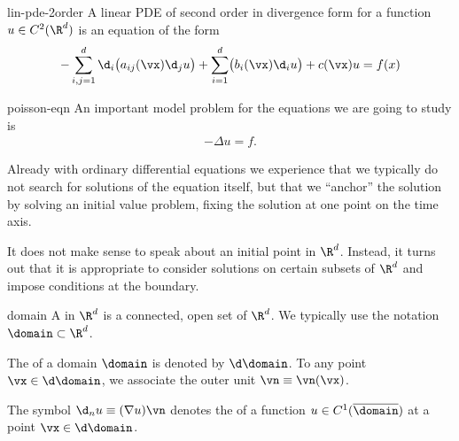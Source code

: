 \begin{Definition}{lin-pde-2order}
  A linear PDE of second order in divergence form for a function
  $u\in C^2(\R^d)$ is an equation of the form
  \begin{gather}
    -\sum_{i,j=1}^d \d_i \bigl(a_{ij}(\vx) \d_j u\bigr)
    + \sum_{i=1}^d \bigl(b_i(\vx) \d_i u\bigr) + c(\vx) u = f(x)
  \end{gather}
\end{Definition}

\begin{Definition}{poisson-eqn}
  An important model problem for the equations we are going to study
  is 
  \begin{gather}
    \label{eq:Poisson}
    -\Delta u = f.
  \end{gather}
\end{Definition}

\begin{intro}
  Already with ordinary differential equations we experience that we
  typically do not search for solutions of the equation itself, but
  that we ``anchor'' the solution by solving an initial value problem,
  fixing the solution at one point on the time axis.

  It does not make sense to speak about an initial point in
  $\R^d$. Instead, it turns out that it is appropriate to consider
  solutions on certain subsets of $\R^d$ and impose conditions at the
  boundary.
\end{intro}

\begin{Definition}{domain}
  A  in $\R^d$ is a connected, open set of $\R^d$. We
  typically use the notation $\domain\subset\R^d$.

  The  of a domain $\domain$ is denoted by
  $\d\domain$. To any point $\vx\in\d\domain$, we associate the outer
  unit  $\vn \equiv \vn(\vx)$.

  The symbol $\d_n u \equiv (\nabla u) \vn$ denotes the  of a function $u\in C^1(\overline{\domain})$ at a point
  $\vx\in\d\domain$.
\end{Definition}

